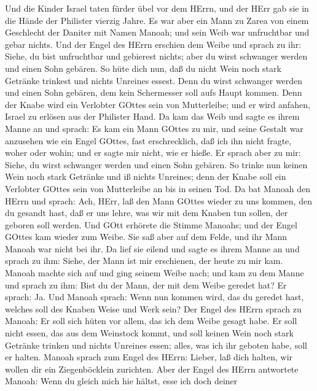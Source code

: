  Und die Kinder Israel taten fürder übel vor dem HErrn, und
der HErr gab sie in die Hände der Philister vierzig Jahre. 
Es war aber ein Mann zu Zarea von einem Geschlecht der Daniter mit Namen
Manoah; und sein Weib war unfruchtbar und gebar nichts.  Und
der Engel des HErrn erschien dem Weibe und sprach zu ihr: Siehe, du bist
unfruchtbar und gebierest nichts; aber du wirst schwanger werden und
einen Sohn gebären.  So hüte dich nun, daß du nicht Wein
noch stark Getränke trinkest und nichts Unreines essest. 
Denn du wirst schwanger werden und einen Sohn gebären, dem kein
Schermesser soll aufs Haupt kommen. Denn der Knabe wird ein Verlobter
GOttes sein von Mutterleibe; und er wird anfahen, Israel zu erlösen aus
der Philister Hand.  Da kam das Weib und sagte es ihrem
Manne an und sprach: Es kam ein Mann GOttes zu mir, und seine Gestalt
war anzusehen wie ein Engel GOttes, fast erschrecklich, daß ich ihn
nicht fragte, woher oder wohin; und er sagte mir nicht, wie er hieße.
 Er sprach aber zu mir: Siehe, du wirst schwanger werden und
einen Sohn gebären. So trinke nun keinen Wein noch stark Getränke und iß
nichts Unreines; denn der Knabe soll ein Verlobter GOttes sein von
Mutterleibe an bis in seinen Tod.  Da bat Manoah den HErrn
und sprach: Ach, HErr, laß den Mann GOttes wieder zu uns kommen, den du
gesandt hast, daß er uns lehre, was wir mit dem Knaben tun sollen, der
geboren soll werden.  Und GOtt erhörete die Stimme Manoahs;
und der Engel GOttes kam wieder zum Weibe. Sie saß aber auf dem Felde,
und ihr Mann Manoah war nicht bei ihr.  Da lief sie eilend
und sagte es ihrem Manne an und sprach zu ihm: Siehe, der Mann ist mir
erschienen, der heute zu mir kam.  Manoah machte sich auf
und ging seinem Weibe nach; und kam zu dem Manne und sprach zu ihm: Bist
du der Mann, der mit dem Weibe geredet hat? Er sprach: Ja. 
Und Manoah sprach: Wenn nun kommen wird, das du geredet hast, welches
soll des Knaben Weise und Werk sein?  Der Engel des HErrn
sprach zu Manoah: Er soll sich hüten vor allem, das ich dem Weibe gesagt
habe.  Er soll nicht essen, das aus dem Weinstock kommt,
und soll keinen Wein noch stark Getränke trinken und nichts Unreines
essen; alles, was ich ihr geboten habe, soll er halten. 
Manoah sprach zum Engel des HErrn: Lieber, laß dich halten, wir wollen
dir ein Ziegenböcklein zurichten.  Aber der Engel des HErrn
antwortete Manoah: Wenn du gleich mich hie hältst, esse ich doch deiner
